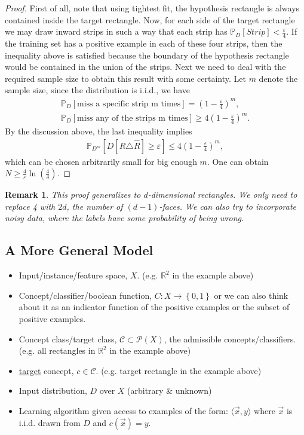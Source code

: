 \documentclass[12pt, letterpaper]{article}
\numberwithin{equation}{section} %
\newcommand{\R}{\mathbb{R}}
\newcommand{\ul}{\underline}
\newcommand{\mb}{\mathbb}
\newcommand{\mc}{\mathcal}
\newcommand{\ve}{\varepsilon}
\newtheorem{remark}[theorem]{Remark}
\theoremstyle{definition}
\theoremstyle{remark}
\begin{document}
\begin{proof}
	First of all, note that using tightest fit, the hypothesis rectangle is always contained inside the target rectangle. Now, for each side of the target rectangle we may draw inward strips in such a way that each strip has $\mb P_D[Strip] < \frac{\ve}{4}$. If the training set has a positive example in each of these four strips, then the inequality above is satisfied because the boundary of the hypothesis rectangle would be contained in the union of the strips. 
	Next we need to deal with the required sample size to obtain this result with some certainty. Let $m$ denote the sample size, since the distribution is i.i.d., we have
	\begin{align*}
		\mb P_D[\textrm{miss a specific strip m times}] = \left(1-\frac{\ve}{4}\right)^m,\\
		\mb P_D[\textrm{miss any of the strips m times}] \geq 4\left(1-\frac{\ve}{4}\right)^m.
	\end{align*}
	By the discussion above, the last inequality implies
	\begin{align*}
		\mb P_{D^m}[D[R\triangle\hat R]\geq \ve] \leq 4\left(1-\frac{\ve}{4}\right)^m,
	\end{align*}
	which can be chosen arbitrarily small for big enough $m$. One can obtain $N\geq \frac4\ve \ln\left(\frac4\delta\right)$.
\end{proof}

\begin{remark}
	This proof generalizes to $d$-dimensional rectangles. We only need to replace 4 with $2d$, the number of $(d-1)$-faces.
	We can also try to incorporate noisy data, where the labels have some probability of being wrong.
\end{remark}


\subsection{A More General Model}

\begin{itemize}
	\item Input/instance/feature space, $X$. (e.g. $\R^2$ in the example above)
	\item Concept/classifier/boolean function, $C: X \rightarrow \left\{0,1\right\}$ or we can also think about it as an indicator function of the positive examples or the subset of positive examples.
	\item Concept class/target class, $\mc C \subset \mc P(X)$, the admissible concepts/classifiers. (e.g. all rectangles in $\R^2$ in the example above)
	\item \ul{target} concept, $c\in\mc C$. (e.g. target rectangle in the example above)
	\item Input distribution, $D$ over $X$ (arbitrary \& unknown)
	\item Learning algorithm given access to examples of the form: $\langle \vec x,y \rangle$ where $\vec x$ is i.i.d. drawn from $D$ and $c(\vec x) = y$.
\end{itemize}
\end{document}
